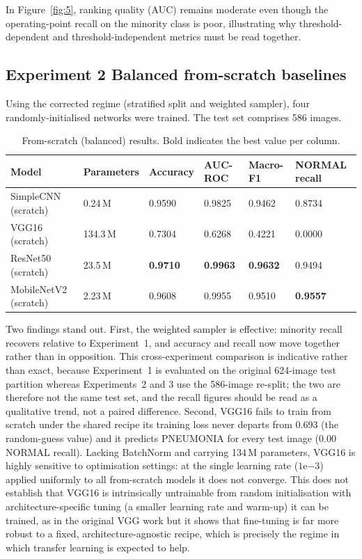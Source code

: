\documentclass[11pt,a4paper]{article}
\numberwithin{figure}{section}
\numberwithin{table}{section}
\begin{document}
In Figure~\ref{fig:5}, ranking quality (AUC) remains moderate even though the operating-point recall on
the minority class is poor, illustrating why threshold-dependent and threshold-independent metrics must
be read together.

\subsection{Experiment 2   Balanced from-scratch baselines}
Using the corrected regime (stratified split and weighted sampler), four randomly-initialised networks
were trained. The test set comprises 586 images.

\begin{table}[H]
\centering
\caption{From-scratch (balanced) results. Bold indicates the best value per column.}
\label{tab:exp2}
\setlength{\tabcolsep}{4pt}
\begin{tabular}{L{34mm} C{20mm} C{18mm} C{17mm} C{17mm} C{20mm}}
\toprule
Model & Parameters & Accuracy & AUC-ROC & Macro-F1 & NORMAL recall \\
\midrule
SimpleCNN (scratch) & 0.24\,M & 0.9590 & 0.9825 & 0.9462 & 0.8734 \\
VGG16 (scratch) & 134.3\,M & 0.7304 & 0.6268 & 0.4221 & 0.0000 \\
ResNet50 (scratch) & 23.5\,M & \textbf{0.9710} & \textbf{0.9963} & \textbf{0.9632} & 0.9494 \\
MobileNetV2 (scratch) & 2.23\,M & 0.9608 & 0.9955 & 0.9510 & \textbf{0.9557} \\
\bottomrule
\end{tabular}
\end{table}

Two findings stand out. First, the weighted sampler is effective: minority recall recovers relative to
Experiment~1, and accuracy and recall now move together rather than in opposition. This cross-experiment
comparison is indicative rather than exact, because Experiment~1 is evaluated on the original 624-image
test partition whereas Experiments~2 and 3 use the 586-image re-split; the two are therefore not the same
test set, and the recall figures should be read as a qualitative trend, not a paired difference. Second,
VGG16 fails to train from scratch under the shared recipe its training loss never departs from 0.693
(the random-guess value) and it predicts PNEUMONIA for every test image (0.00 NORMAL recall). Lacking
BatchNorm and carrying 134\,M parameters, VGG16 is highly sensitive to optimisation settings: at the
single learning rate ($1\mathrm{e}{-3}$) applied uniformly to all from-scratch models it does not
converge. This does not establish that VGG16 is intrinsically untrainable from random
initialisation with architecture-specific tuning (a smaller learning rate and warm-up) it can be
trained, as in the original VGG work but it shows that fine-tuning is far more robust to a fixed,
architecture-agnostic recipe, which is precisely the regime in which transfer learning is expected to
help.
\end{document}
